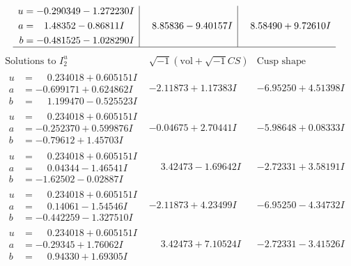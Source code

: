 \documentclass[1p]{elsarticle_modified}
\theoremstyle{definition}
\newcommand{\I}{\sqrt{-1}}
\begin{document}
$$\begin{array}{c|c|c}
\begin{aligned}
u &= -0.290349 - 1.272230 I \\
a &= \phantom{-}1.48352 - 0.86811 I \\
b &= -0.481525 - 1.028290 I\end{aligned}
 & \phantom{-}8.85836 - 9.40157 I & \phantom{-}8.58490 + 9.72610 I\\
 \hline 
 \end{array}$$\newpage$$\begin{array}{c|c|c}  
\text{Solutions to }I^u_{2}& \I (\text{vol} + \sqrt{-1}CS) & \text{Cusp shape}\\
 \hline 
\begin{aligned}
u &= \phantom{-}0.234018 + 0.605151 I \\
a &= -0.699171 + 0.624862 I \\
b &= \phantom{-}1.199470 - 0.525523 I\end{aligned}
 & -2.11873 + 1.17383 I & -6.95250 + 4.51398 I \\ \hline\begin{aligned}
u &= \phantom{-}0.234018 + 0.605151 I \\
a &= -0.252370 + 0.599876 I \\
b &= -0.79612 + 1.45703 I\end{aligned}
 & -0.04675 + 2.70441 I & -5.98648 + 0.08333 I \\ \hline\begin{aligned}
u &= \phantom{-}0.234018 + 0.605151 I \\
a &= \phantom{-}0.04344 - 1.46541 I \\
b &= -1.62502 - 0.02887 I\end{aligned}
 & \phantom{-}3.42473 - 1.69642 I & -2.72331 + 3.58191 I \\ \hline\begin{aligned}
u &= \phantom{-}0.234018 + 0.605151 I \\
a &= \phantom{-}0.14061 - 1.54546 I \\
b &= -0.442259 - 1.327510 I\end{aligned}
 & -2.11873 + 4.23499 I & -6.95250 - 4.34732 I \\ \hline\begin{aligned}
u &= \phantom{-}0.234018 + 0.605151 I \\
a &= -0.29345 + 1.76062 I \\
b &= \phantom{-}0.94330 + 1.69305 I\end{aligned}
 & \phantom{-}3.42473 + 7.10524 I & -2.72331 - 3.41526 I \\ \hline\begin{aligned}

\end{aligned}
\end{array}$$
\end{document}
